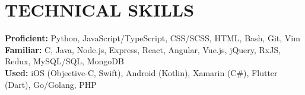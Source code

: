 \documentclass[10pt]{article}
\begin{document}
\section*{TECHNICAL SKILLS}
\textbf{Proficient:} Python, JavaScript/TypeScript, CSS/SCSS, HTML, Bash, Git, Vim\\
\textbf{Familiar:} C, Java, Node.js, Express, React, Angular, Vue.js, jQuery, RxJS, Redux, MySQL/SQL, MongoDB\\
\textbf{Used:} iOS (Objective-C, Swift), Android (Kotlin), Xamarin (C\#), Flutter (Dart), Go/Golang, PHP
\end{document}
